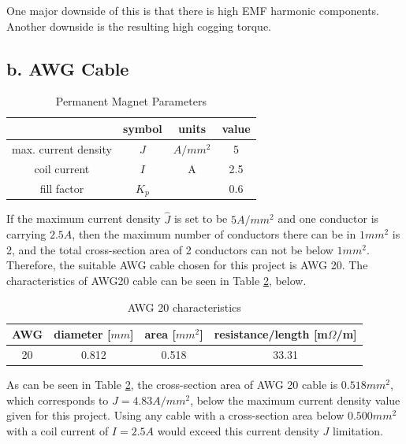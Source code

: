 \documentclass[a4paper, 11pt, titlepage]{article}
\begin{document}
One major downside of this is that there is high EMF harmonic components. Another downside is the resulting high cogging torque.

\subsection{b. AWG Cable}

\begin{table}[h]
	\begin{center}
		\begin{tabular}{c|c|c|c}
			 & symbol & units & value \\
			\hline
			max. current density & $J$ & $A/mm^2$ & 5 \\
			coil current & $I$ & A & 2.5 \\ 
			fill factor & $K_p$ & & 0.6 \\
			\hline
		\end{tabular}
	\end{center}
	\caption{Permanent Magnet Parameters}
	\label{fig:PMParameters}
\end{table}


If the maximum current density $\hat{J}$ is set to be $5 A/mm^2$ and one conductor is carrying $2.5A$, then the maximum number of conductors there can be in $1mm^2$ is 2, and the total cross-section area of 2 conductors can not be below $1mm^2$. Therefore, the suitable AWG cable chosen for this project is AWG 20. The characteristics of AWG20 cable can be seen in Table \ref{tab:AWG20}, below.

\begin{table}[h]
	\begin{center}
		\begin{tabular}{c|c|c|c}
			AWG & diameter [$mm$] & area [$mm^2$] & resistance/length [m$\Omega$/m] \\
			\hline
			20 &  0.812 & 0.518 & 33.31 \\
			\hline
		\end{tabular}
	\end{center}
	\caption{AWG 20 characteristics}
	\label{tab:AWG20}
\end{table}


As can be seen in Table \ref{tab:AWG20}, the cross-section area of AWG 20 cable is $0.518mm^2$, which corresponds to $J=4.83A/mm^2$, below the maximum current density value given for this project. Using any cable with a cross-section area below $0.500mm^2$ with a coil current of $I=2.5A$ would exceed this current density $J$ limitation.
\end{document}
